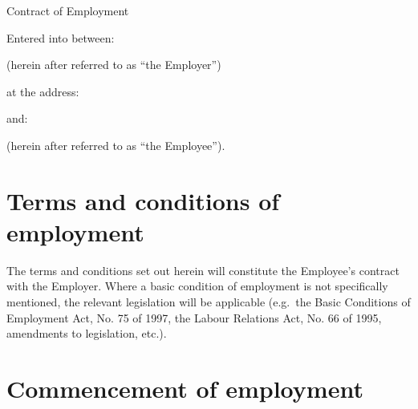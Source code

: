 \documentclass[a4paper,11pt]{article}
\begin{document}
\raggedright

\begin{center}
  {\Huge \textsf{Contract of Employment}}

  \vspace{2cm}

  Entered into between:

  \vspace{0.5cm}


  (herein after referred to as ``the Employer'')

  \vspace{1cm}

  at the address:

  \vspace{0.5cm}





  \vspace{1cm}

  and:

  \vspace{0.5cm}


  (herein after referred to as ``the Employee'').

\end{center}

\noindent\hrulefill %

\section{Terms and conditions of employment}

\para The terms and conditions set out herein will constitute the Employee's
contract with the Employer. Where a basic condition of employment is not
specifically mentioned, the relevant legislation will be applicable (e.g.\ the
Basic Conditions of Employment Act, No. 75 of 1997, the Labour Relations Act,
No. 66 of 1995, amendments to legislation, etc.).

\section{Commencement of employment}
\label{commencement}
\end{document}
